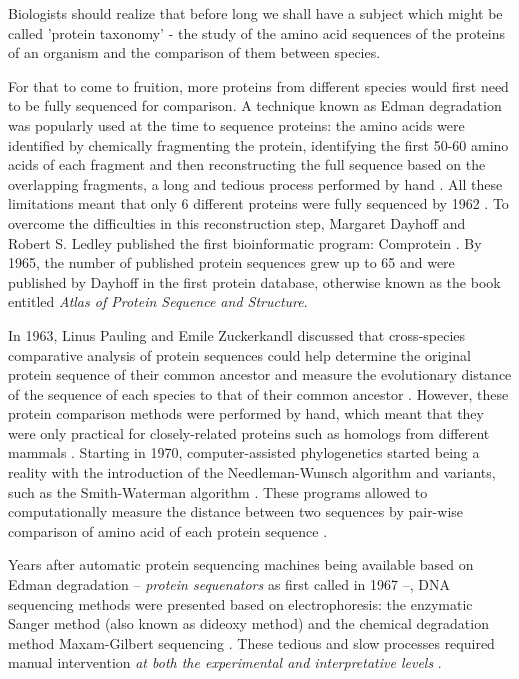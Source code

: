 \begin{displayquote}
Biologists should realize that before long we shall have a subject which might be called 'protein taxonomy' - the study of the amino acid sequences of the proteins of an organism and the comparison of them between species.
\end{displayquote}

For that to come to fruition, more proteins from different species would first need to be fully sequenced for comparison. A technique known as Edman degradation was popularly used at the time to sequence proteins: the amino acids were identified by chemically fragmenting the protein, identifying the first 50-60 amino acids of each fragment and then reconstructing the full sequence based on the overlapping fragments, a long and tedious process performed by hand \cite{gauthier:2018ws,edman:1949ww}. All these limitations meant that only 6 different proteins were fully sequenced by 1962 \cite{dayhoff:1962up}. To overcome the difficulties in this reconstruction step, Margaret Dayhoff and Robert S. Ledley published the first bioinformatic program: Comprotein \cite{gauthier:2018ws,dayhoff:1962up}. By 1965, the number of published protein sequences grew up to 65 and were published by Dayhoff in the first protein database, otherwise known as the book entitled \emph{Atlas of Protein Sequence and Structure}\cite{dayhoff:1965vv}.

In 1963, Linus Pauling and Emile Zuckerkandl discussed that cross-species comparative analysis of protein sequences could help determine the original protein sequence of their common ancestor and measure the evolutionary distance of the sequence of each species to that of their common ancestor \cite{pauling:1963uo}. However, these protein comparison methods were performed by hand, which meant that they were only practical for closely-related proteins such as homologs from different mammals \cite{gauthier:2018ws}. Starting in 1970, computer-assisted phylogenetics started being a reality with the introduction of the Needleman-Wunsch algorithm \cite{needleman:1970vq} and variants, such as the Smith-Waterman algorithm \cite{smith:1981up}. These programs allowed to computationally measure the distance between two sequences by pair-wise comparison of amino acid of each protein sequence \cite{needleman:1970vq,smith:1981up}.


Years after automatic protein sequencing machines being available based on Edman degradation -- \emph{protein sequenators} as first called in 1967 \cite{edman:1967tc} --, DNA sequencing methods were presented based on electrophoresis: the enzymatic Sanger method (also known as dideoxy method) \cite{sanger:1977vp} and the chemical degradation method Maxam-Gilbert sequencing \cite{maxam:1977vy}. These tedious and slow processes required manual intervention \emph{at both the experimental and interpretative levels} \cite{hood:1987va}.

